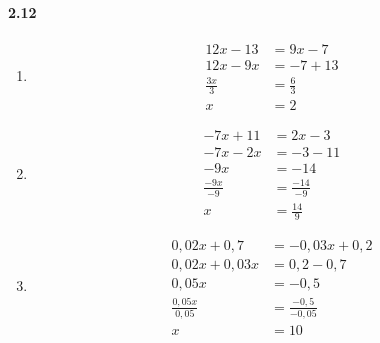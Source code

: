 \documentclass{article}
\newcommand\litem[1]{\item{\bfseries#1\space}}
\begin{document}
\paragraph{2.12}
\begin{enumerate}[label=\emph{\alph*})]
\litem{
\begin{align*}
  12x - 13 &= 9x - 7 \\
  12x - 9x &= -7 + 13 \\
  \frac{3x}{3} &= \frac{6}{3} \\
  x &= 2
 \end{align*}
}
\litem{
\begin{align*}
  -7x + 11 &= 2x - 3 \\
  -7x - 2x &= -3 - 11 \\
  -9x &= -14 \\
  \frac{-9x}{-9} &= \frac{-14}{-9} \\
  x &= \frac{14}{9}
\end{align*}
}
\litem{
\begin{align*}
  0,02x + 0,7 &= -0,03x + 0,2 \\
  0,02x + 0,03x &= 0,2 - 0,7 \\
  0,05x &= -0,5 \\
  \frac{0,05x}{0,05} &= \frac{-0,5}{-0,05} \\
  x &= 10
\end{align*}
}
\end{enumerate}
\end{document}
